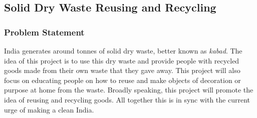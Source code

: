 \documentclass{article}
\begin{document}
\subsection{Solid Dry Waste Reusing and Recycling}
\subsubsection{Problem Statement}
India generates around tonnes of solid dry waste, better known as \textit{kabad}. The idea of this project is to use this dry waste and provide people with recycled goods made from their own waste that they gave away. This project will also focus on educating people on how to reuse and make objects of decoration or purpose at home from the waste. Broadly speaking, this project will promote the idea of reusing and recycling goods. All together this is in sync with the current urge of making a clean India. 
\end{document}
